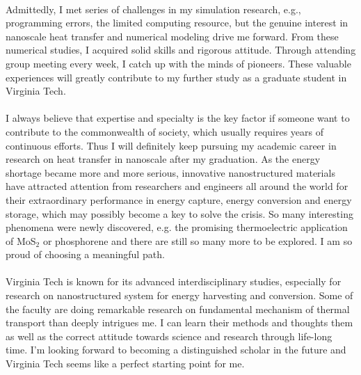 \documentclass[a4paper,12pt]{article}
\begin{document}
\begin{spacing}{1.5}
 \\
Admittedly, I met series of challenges in my simulation research, e.g., programming errors, the limited computing resource, but the genuine interest in nanoscale heat transfer and numerical modeling drive me forward. From these numerical studies, I acquired solid skills and rigorous attitude. Through attending group meeting every week, I catch up with the minds of pioneers. These valuable experiences will greatly contribute to my further study as a graduate student in Virginia Tech.\\
\\
I always believe that expertise and specialty is the key factor if someone want to contribute to the commonwealth of society, which usually requires years of continuous efforts. Thus I will definitely keep pursuing my academic career in research on heat transfer in nanoscale after my graduation. As the energy shortage became more and more serious, innovative nanostructured materials have attracted attention from researchers and engineers all around the world for their extraordinary performance in energy capture, energy conversion and energy storage, which may possibly become a key to solve the crisis. So many interesting phenomena were newly discovered, e.g. the promising thermoelectric application of MoS$_2$ or phosphorene and there are still so many more to be explored. I am so proud of choosing a meaningful path.\\
\\
Virginia Tech is known for its advanced interdisciplinary studies, especially for research on nanostructured system for energy harvesting and conversion. Some of the faculty are doing remarkable research on fundamental mechanism of thermal transport than deeply intrigues me. I can learn their methods and thoughts them as well as the correct attitude towards science and research through life-long time. I’m looking forward to becoming a distinguished scholar in the future and Virginia Tech seems like a perfect starting point for me. \\
\\

\end{spacing}
\end{document}
